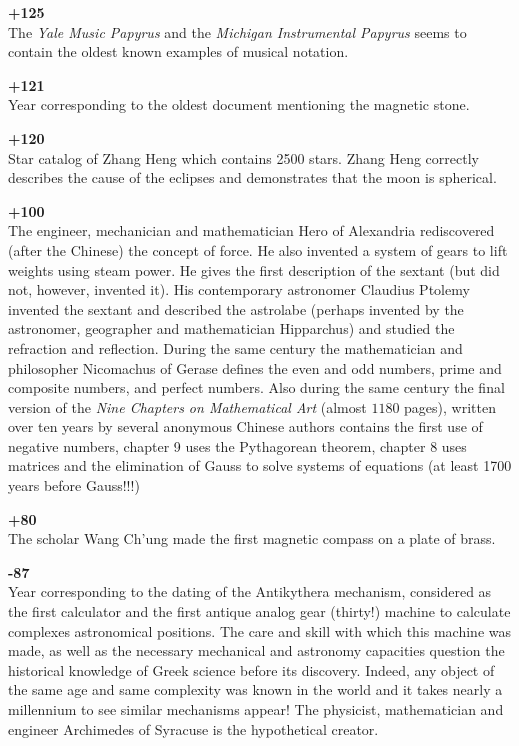 \textbf{+125}\\
The \textit{Yale Music Papyrus} and the \textit{Michigan Instrumental Papyrus} seems to contain the oldest known examples of musical notation.

\textbf{+121}\\
Year corresponding to the oldest document mentioning the magnetic stone.

\textbf{+120}\\
Star catalog of Zhang Heng which contains 2500 stars. Zhang Heng correctly describes the cause of the eclipses and demonstrates that the moon is spherical.

\textbf{+100}\\
The engineer, mechanician and mathematician Hero of Alexandria rediscovered (after the Chinese) the concept of force. He also invented a system of gears to lift weights using steam power. He gives the first description of the sextant (but did not, however, invented it). His contemporary astronomer Claudius Ptolemy invented the sextant and described the astrolabe (perhaps invented by the astronomer, geographer and mathematician Hipparchus) and studied the refraction and reflection. During the same century the mathematician and philosopher Nicomachus of Gerase defines the even and odd numbers, prime and composite numbers, and perfect numbers. Also during the same century the final version of the \textit{Nine Chapters on Mathematical Art} (almost $1180$ pages), written over ten years by several anonymous Chinese authors contains the first use of negative numbers, chapter 9 uses the Pythagorean theorem, chapter 8 uses matrices and the elimination of Gauss to solve systems of equations (at least 1700 years before Gauss!!!)

\textbf{+80}\\
The scholar Wang Ch'ung made the first magnetic compass on a plate of brass.

\textbf{-87}\\
Year corresponding to the dating of the Antikythera mechanism, considered as the first calculator and the first antique analog gear (thirty!) machine to calculate complexes astronomical positions. The care and skill with which this machine was made, as well as the necessary mechanical and astronomy capacities question the historical knowledge of Greek science before its discovery. Indeed, any object of the same age and same complexity was known in the world and it takes nearly a millennium to see similar mechanisms appear! The physicist, mathematician and engineer Archimedes of Syracuse is the hypothetical creator.

